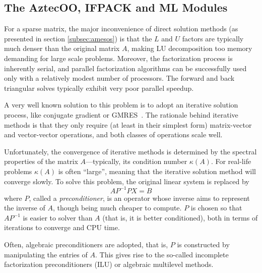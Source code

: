 \documentclass[acmtocl]{acmtrans2m}
\begin{document}
\subsection{The AztecOO, IFPACK and ML Modules}
\label{subsec:aztecoo_ifpack}

For a sparse matrix, the major inconvenience of direct solution
methods (as presented in section \ref{subsec:amesos}) is that the $L$
and $U$ factors are typically much denser than the original matrix
$A$, making LU decomposition too memory demanding for large scale
problems. Moreover, the factorization process is inherently serial,
and parallel factorization algorithms can be successfully used only
with a relatively modest number of processors. The forward and back
triangular solves typically exhibit very poor parallel speedup.

A very well known solution to this problem is to adopt an iterative
solution process, like conjugate gradient or
GMRES~\cite{golub96matrix}. The rationale behind iterative methods
is that they only require (at least in their simplest form)
matrix-vector and vector-vector operations, and both classes of
operations scale well.

Unfortunately, the convergence of iterative methods is determined by
the spectral properties of the matrix $A$---typically, its condition
number $\kappa(A)$.  For real-life problems $\kappa(A)$ is often
``large'', meaning that the iterative solution method will converge
slowly. To solve this problem, the original linear system is replaced
by
\[
A P^{-1} P X = B
\]
where $P$, called a {\sl preconditioner}, is an operator whose inverse
aims to represent the inverse of $A$, though being much cheaper to
compute.  $P$ is chosen so that $AP^{-1}$ is easier to solver than $A$
(that is, it is better conditioned), both in terms of iterations to
converge and CPU time.

\smallskip

Often, algebraic preconditioners are adopted, that is, $P$ is
constructed by manipulating the entries of $A$. This gives rise to the
so-called incomplete factorization preconditioners (ILU) or algebraic
multilevel methods.
\end{document}
